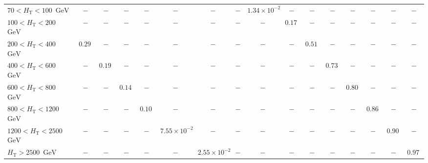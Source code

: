 \documentclass[twocolumn,epjc3]{svjour3}
\newcommand{\HT}{\ensuremath{H_{\mathrm{T}}}\xspace}
\newcommand{\GeV}{\ensuremath{\textrm{GeV}}\xspace}
\begin{document}
\begin{table}
{\begin{tabular}{lccccccccccccccc}
\hline
$  70 < \HT <  100$~\GeV &  $-$ &  $-$ &  $-$ &  $-$ &  $-$ &  $-$ &  $-$ &  $1.34\times10^{-2}$ &  $-$ &  $-$ &  $-$ &  $-$ &  $-$ &  $-$ &  $-$ \\
$ 100 < \HT <  200$~\GeV &  $-$ &  $-$ &  $-$ &  $-$ &  $-$ &  $-$ &  $-$ &  $-$ &  $0.175$ &  $-$ &  $-$ &  $-$ &  $-$ &  $-$ &  $-$ \\
$ 200 < \HT <  400$~\GeV &  $0.298$ &  $-$ &  $-$ &  $-$ &  $-$ &  $-$ &  $-$ &  $-$ &  $-$ &  $0.517$ &  $-$ &  $-$ &  $-$ &  $-$ &  $-$ \\
$ 400 < \HT <  600$~\GeV &  $-$ &  $0.190$ &  $-$ &  $-$ &  $-$ &  $-$ &  $-$ &  $-$ &  $-$ &  $-$ &  $0.734$ &  $-$ &  $-$ &  $-$ &  $-$ \\
$ 600 < \HT <  800$~\GeV &  $-$ &  $-$ &  $0.141$ &  $-$ &  $-$ &  $-$ &  $-$ &  $-$ &  $-$ &  $-$ &  $-$ &  $0.806$ &  $-$ &  $-$ &  $-$ \\
$ 800 < \HT < 1200$~\GeV &  $-$ &  $-$ &  $-$ &  $0.106$ &  $-$ &  $-$ &  $-$ &  $-$ &  $-$ &  $-$ &  $-$ &  $-$ &  $0.862$ &  $-$ &  $-$ \\
$1200 < \HT < 2500$~\GeV &  $-$ &  $-$ &  $-$ &  $-$ &  $7.55\times10^{-2}$ &  $-$ &  $-$ &  $-$ &  $-$ &  $-$ &  $-$ &  $-$ &  $-$ &  $0.904$ &  $-$ \\
$       \HT > 2500$~\GeV &  $-$ &  $-$ &  $-$ &  $-$ &  $-$ &  $2.55\times10^{-2}$ &  $-$ &  $-$ &  $-$ &  $-$ &  $-$ &  $-$ &  $-$ &  $-$ &  $0.973$ \\
\hline
\end{tabular}
}
\end{table}
\end{document}
